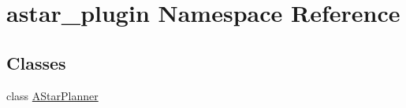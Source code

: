 \hypertarget{namespaceastar__plugin}{}\section{astar\+\_\+plugin Namespace Reference}
\label{namespaceastar__plugin}
\subsection*{Classes}
\begin{DoxyCompactItemize}
\item 
class \hyperlink{classastar__plugin_1_1_a_star_planner}{A\+Star\+Planner}
\end{DoxyCompactItemize}
